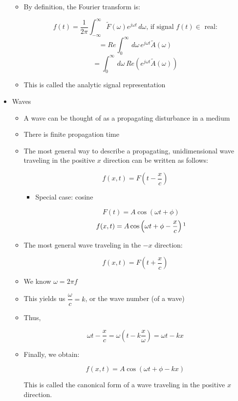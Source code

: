 \begin{itemize}
\begin{itemize}
      \item By definition, the Fourier transform is:

        $$f(t)=\frac{1}{2\pi}\int_{-\infty}^{\infty}\tilde{F}(\omega)e^{j\omega t}\,d\omega\text{, if signal $f(t)\in$ real:}$$
        $$=Re\int_0^{\infty}\,d\omega\,e^{j\omega t}\tilde{A}(\omega)$$
        $$=\int_0^{\infty}\,d\omega\,Re\left( e^{j\omega t} \tilde{A}(\omega)\right)$$

      \item This is called the analytic signal representation

    \end{itemize}

  \item Waves

    \begin{itemize}

      \item A wave can be thought of as a propagating disturbance in a medium

      \item There is finite propagation time

      \item The most general way to describe a propagating, unidimensional wave traveling in the positive $x$ direction can be written as follows:

        $$f(x,t)=F\left(t-\frac{x}{c}\right)$$

        \begin{itemize}

          \item Special case: cosine

            $$F(t)=A\cos(\omega t+\phi)$$
            $$f(x,t)=A\cos\left(\omega t + \phi - \frac{x}{c}\right)\footnote{This wave is in the $+x$ direction}$$

        \end{itemize}

      \item The most general wave traveling in the $-x$ direction:

        $$f(x,t)=F\left( t+\frac{x}{c} \right)$$

      \item We know $\omega=2\pi f$

      \item This yields us $\dfrac{\omega}{c}=k$, or the wave number (of a wave)

      \item Thus,

        $$\omega t-\frac{x}{c}=\omega \left( t-k\frac{x}{\omega} \right)=\omega t-kx$$

      \item Finally, we obtain:

        $$f(x,t)=A\cos(\omega t+\phi - kx)$$

        This is called the canonical form of a wave traveling in the positive $x$ direction.

    \end{itemize}

\end{itemize}



